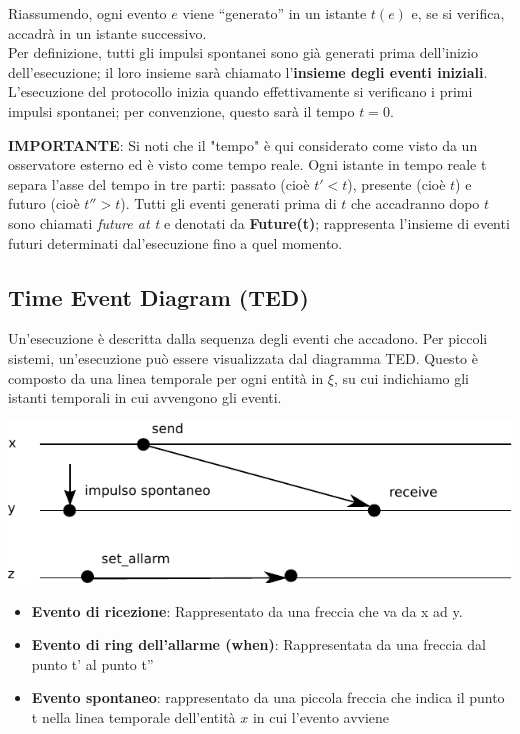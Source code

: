 Riassumendo, ogni evento $e$ viene “generato” in un istante $t(e)$ e, se si
verifica, accadrà in un istante successivo.\\
Per definizione, tutti gli impulsi spontanei sono già generati prima dell'inizio
dell'esecuzione; il loro insieme sarà chiamato l'\textbf{insieme degli eventi
    iniziali}. L'esecuzione del protocollo inizia quando effettivamente si
verificano i primi impulsi spontanei; per convenzione, questo sarà il tempo $t =
    0$.

\textbf{IMPORTANTE}: Si noti che il "tempo" è qui considerato come visto da un
osservatore esterno ed è visto come tempo reale. Ogni istante in tempo reale t
separa l'asse del tempo in tre parti: passato (cioè {$t' < t$}), presente (cioè
$t$) e futuro (cioè {$t'' > t$}). Tutti gli eventi generati prima di $t$ che
accadranno dopo $t$ sono chiamati \textit{future at t} e denotati da
\textbf{Future(t)}; rappresenta l'insieme di eventi futuri determinati
dal'esecuzione fino a quel momento.

\subsection*{Time Event Diagram (TED)}
Un'esecuzione è descritta dalla sequenza degli eventi che accadono. Per piccoli
sistemi, un'esecuzione può essere visualizzata dal diagramma TED. Questo è
composto da una linea temporale per ogni entità in $\xi$, su cui indichiamo gli
istanti temporali in cui avvengono gli eventi.
\begin{center}
    \includegraphics[scale=0.8]{capitoli/introduzione_ambiente-distribuito/imgs/n_07}
\end{center}

\begin{itemize}
    \item \textbf{Evento di ricezione}: Rappresentato da una freccia che va da x
          ad y.
    \item \textbf{Evento di ring dell'allarme (when)}: Rappresentata da una
          freccia dal punto t' al punto t''
    \item \textbf{Evento spontaneo}: rappresentato da una piccola freccia che
          indica il punto t nella linea temporale dell'entità $x$ in cui l'evento
          avviene
\end{itemize}

